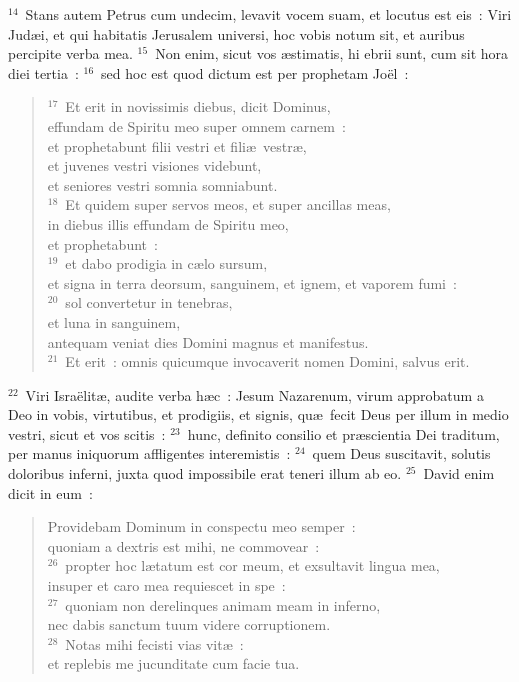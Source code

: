 ${}^{14}$~Stans autem Petrus cum undecim, levavit vocem suam, et locutus est eis~: Viri Jud\ae i, et qui habitatis Jerusalem universi, hoc vobis notum sit, et auribus percipite verba mea.
${}^{15}$~Non enim, sicut vos \ae stimatis, hi ebrii sunt, cum sit hora diei tertia~:
${}^{16}$~sed hoc est quod dictum est per prophetam Jo\"el~:
\begin{flushleft}\begin{verse}${}^{17}$~Et erit in novissimis diebus, dicit Dominus,\\ effundam de Spiritu meo super omnem carnem~:\\ et prophetabunt filii vestri et fili\ae\ vestr\ae ,\\ et juvenes vestri visiones videbunt,\\ et seniores vestri somnia somniabunt.\\
${}^{18}$~Et quidem super servos meos, et super ancillas meas,\\ in diebus illis effundam de Spiritu meo,\\ et prophetabunt~:\\
${}^{19}$~et dabo prodigia in c\ae lo sursum,\\ et signa in terra deorsum, sanguinem, et ignem, et vaporem fumi~:\\
${}^{20}$~sol convertetur in tenebras,\\ et luna in sanguinem,\\ antequam veniat dies Domini magnus et manifestus.\\
${}^{21}$~Et erit~: omnis quicumque invocaverit nomen Domini, salvus erit.\end{verse}\end{flushleft}


${}^{22}$~Viri Isra\"elit\ae , audite verba h\ae c~: Jesum Nazarenum, virum approbatum a Deo in vobis, virtutibus, et prodigiis, et signis, qu\ae\ fecit Deus per illum in medio vestri, sicut et vos scitis~:
${}^{23}$~hunc, definito consilio et pr\ae scientia Dei traditum, per manus iniquorum affligentes interemistis~:
${}^{24}$~quem Deus suscitavit, solutis doloribus inferni, juxta quod impossibile erat teneri illum ab eo.
${}^{25}$~David enim dicit in eum~: \begin{flushleft}\begin{verse}Providebam Dominum in conspectu meo semper~:\\ quoniam a dextris est mihi, ne commovear~:\\
${}^{26}$~propter hoc l\ae tatum est cor meum, et exsultavit lingua mea,\\ insuper et caro mea requiescet in spe~:\\
${}^{27}$~quoniam non derelinques animam meam in inferno,\\ nec dabis sanctum tuum videre corruptionem.\\
${}^{28}$~Notas mihi fecisti vias vit\ae~:\\ et replebis me jucunditate cum facie tua.\end{verse}\end{flushleft}


